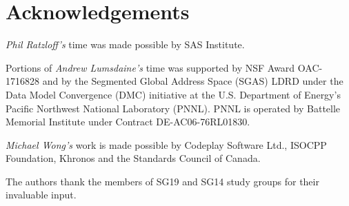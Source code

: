 
\chapter*{Acknowledgements}

\textit{Phil Ratzloff's} time was made possible by SAS Institute.

Portions of \textit{Andrew Lumsdaine's} time was supported by NSF Award OAC-1716828 and by the
Segmented Global Address Space (SGAS) LDRD under the Data Model Convergence (DMC)
initiative at the U.S. Department of Energy's Pacific Northwest National Laboratory
(PNNL). PNNL is operated by Battelle Memorial Institute under Contract
DE-AC06-76RL01830.

\textit{Michael Wong's} work is made possible by Codeplay Software Ltd., ISOCPP Foundation, Khronos and the Standards Council of Canada.  

The authors thank the members of SG19 and SG14 study groups for their invaluable input.
